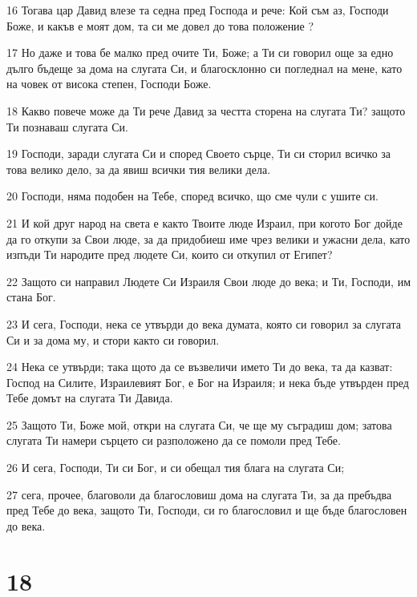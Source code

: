 \par 16 Тогава цар Давид влезе та седна пред Господа и рече: Кой съм аз, Господи Боже, и какъв е моят дом, та си ме довел до това положение ?
\par 17 Но даже и това бе малко пред очите Ти, Боже; а Ти си говорил още за едно дълго бъдеще за дома на слугата Си, и благосклонно си погледнал на мене, като на човек от висока степен, Господи Боже.
\par 18 Какво повече може да Ти рече Давид за честта сторена на слугата Ти? защото Ти познаваш слугата Си.
\par 19 Господи, заради слугата Си и според Своето сърце, Ти си сторил всичко за това велико дело, за да явиш всички тия велики дела.
\par 20 Господи, няма подобен на Тебе, според всичко, що сме чули с ушите си.
\par 21 И кой друг народ на света е както Твоите люде Израил, при когото Бог дойде да го откупи за Свои люде, за да придобиеш име чрез велики и ужасни дела, като изпъди Ти народите пред людете Си, които си откупил от Египет?
\par 22 Защото си направил Людете Си Израиля Свои люде до века; и Ти, Господи, им стана Бог.
\par 23 И сега, Господи, нека се утвърди до века думата, която си говорил за слугата Си и за дома му, и стори както си говорил.
\par 24 Нека се утвърди; така щото да се възвеличи името Ти до века, та да казват: Господ на Силите, Израилевият Бог, е Бог на Израиля; и нека бъде утвърден пред Тебе домът на слугата Ти Давида.
\par 25 Защото Ти, Боже мой, откри на слугата Си, че ще му съградиш дом; затова слугата Ти намери сърцето си разположено да се помоли пред Тебе.
\par 26 И сега, Господи, Ти си Бог, и си обещал тия блага на слугата Си;
\par 27 сега, прочее, благоволи да благословиш дома на слугата Ти, за да пребъдва пред Тебе до века, защото Ти, Господи, си го благословил и ще бъде благословен до века.

\chapter{18}

